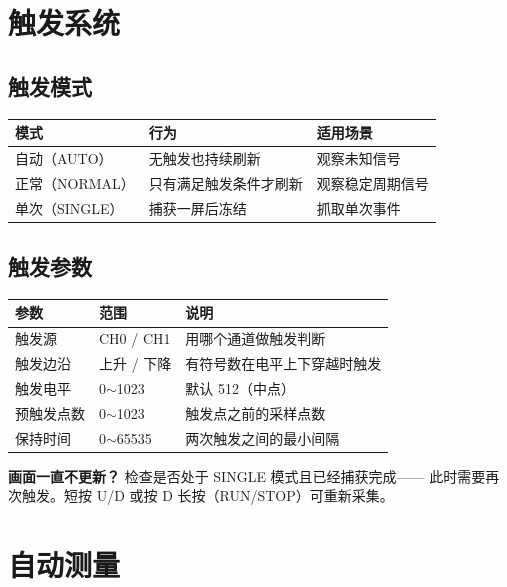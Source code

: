 \documentclass[UTF8,a4paper,11pt]{ctexart}
\begin{document}
\section{触发系统}

\subsection{触发模式}

\begin{center}
\small
\begin{tabular}{lll}
\toprule
模式 & 行为 & 适用场景\\
\midrule
自动（AUTO） & 无触发也持续刷新 & 观察未知信号\\
正常（NORMAL） & 只有满足触发条件才刷新 & 观察稳定周期信号\\
单次（SINGLE） & 捕获一屏后冻结 & 抓取单次事件\\
\bottomrule
\end{tabular}
\end{center}

\subsection{触发参数}

\begin{center}
\small
\begin{tabular}{lll}
\toprule
参数 & 范围 & 说明\\
\midrule
触发源 & CH0 / CH1 & 用哪个通道做触发判断\\
触发边沿 & 上升 / 下降 & 有符号数在电平上下穿越时触发\\
触发电平 & 0$\sim$1023 & 默认 512（中点）\\
预触发点数 & 0$\sim$1023 & 触发点之前的采样点数\\
保持时间 & 0$\sim$65535 & 两次触发之间的最小间隔\\
\bottomrule
\end{tabular}
\end{center}

\begin{tipbox}
\textbf{画面一直不更新？} 检查是否处于 SINGLE 模式且已经捕获完成——
此时需要再次触发。短按 U/D 或按 D 长按（RUN/STOP）可重新采集。
\end{tipbox}

\section{自动测量}
\end{document}
